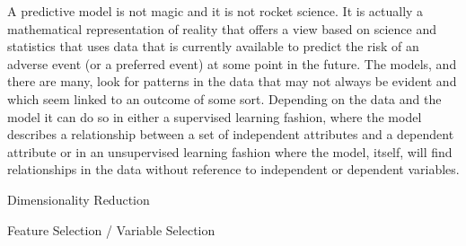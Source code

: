 A predictive model is not magic and it is not rocket science. It is actually a mathematical representation
of reality that offers a view based on science and statistics that uses data that is currently available to
predict the risk of an adverse event (or a preferred event) at some point in the future. The models, and
there are many, look for patterns in the data that may not always be evident and which seem linked to
an outcome of some sort. Depending on the data and the model it can do so in either a supervised
learning fashion, where the model describes a relationship between a set of independent attributes and
a dependent attribute or in an unsupervised learning fashion where the model, itself, will find
relationships in the data without reference to independent or dependent variables.



Dimensionality Reduction

Feature Selection / Variable Selection

